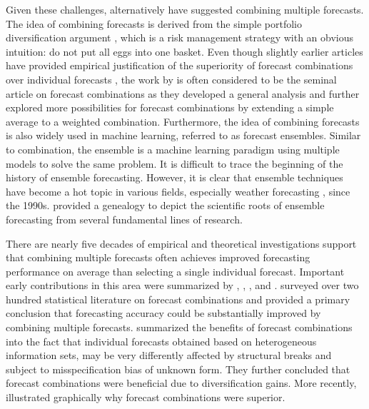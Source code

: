 \documentclass[11pt]{article}
\begin{document}
Given these challenges, alternatively \cite{Bates1969-yj} have suggested combining multiple forecasts. The idea of combining forecasts is derived from the simple portfolio diversification argument \citep{Timmermann2006-en}, which is a risk management strategy with an obvious intuition: do not put all eggs into one basket. Even though slightly earlier articles have provided empirical justification of the superiority of forecast combinations over individual forecasts \citep[e.g.,][]{Barnard1963-xa,crane1967two}, the work by \cite{Bates1969-yj} is often considered to be the seminal article on forecast combinations as they developed a general analysis and further explored more possibilities for forecast combinations by extending a simple average to a weighted combination. Furthermore, the idea of combining forecasts is also widely used in machine learning, referred to as forecast ensembles. Similar to combination, the ensemble is a machine learning paradigm using multiple models to solve the same problem. It is difficult to trace the beginning of the history of ensemble forecasting. However, it is clear that ensemble techniques have become a hot topic in various fields, especially weather forecasting \cite[see an overview by][]{Leutbecher2008-mc}, since the 1990s. \cite{Lewis2005-hu} provided a genealogy to depict the scientific roots of ensemble forecasting from several fundamental lines of research. 

There are nearly five decades of empirical and theoretical investigations support that combining multiple forecasts often achieves improved forecasting performance on average than selecting a single individual forecast. Important early contributions in this area were summarized by \cite{Granger1989-gv}, \cite{Clemen1989-fb}, \cite{Palm1992-im}, and \cite{Timmermann2006-en}. \cite{Clemen1989-fb} surveyed over two hundred statistical literature on forecast combinations and provided a primary conclusion that forecasting accuracy could be substantially improved by combining multiple forecasts. \cite{Timmermann2006-en} summarized the benefits of forecast combinations into the fact that individual forecasts obtained based on heterogeneous information sets, may be very differently affected by structural breaks and subject to misspecification bias of unknown form. They further concluded that forecast combinations were beneficial due to diversification gains. More recently, \cite{Atiya2020-ge} illustrated graphically why forecast combinations were superior.
\end{document}
